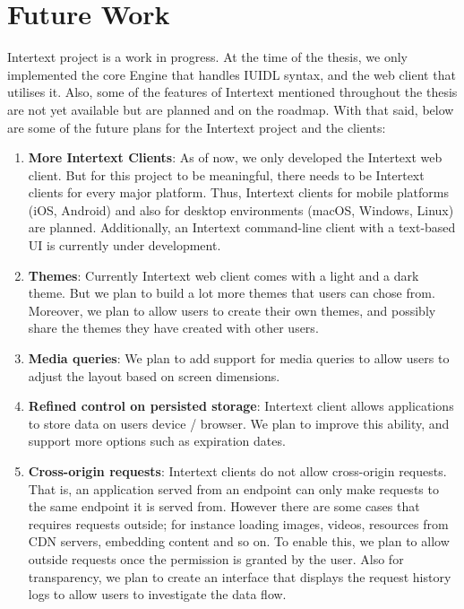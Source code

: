 \section{Future Work} \label{futureWork}

Intertext project is a work in progress. At the time of the thesis, we only implemented the core Engine that handles IUIDL syntax, and the web client that utilises it. Also, some of the features of Intertext mentioned throughout the thesis are not yet available but are planned and on the roadmap. With that said, below are some of the future plans for the Intertext project and the clients:

\begin{enumerate}
    \item \textbf{More Intertext Clients}: As of now, we only developed the Intertext web client. But for this project to be meaningful, there needs to be Intertext clients for every major platform. Thus, Intertext clients for mobile platforms (iOS, Android) and also for desktop environments (macOS, Windows, Linux) are planned. Additionally, an Intertext command-line client with a text-based UI is currently under development.
    
    \item \textbf{Themes}: Currently Intertext web client comes with a light and a dark theme. But we plan to build a lot more themes that users can chose from. Moreover, we plan to allow users to create their own themes, and possibly share the themes they have created with other users.
    
    \item \textbf{Media queries}: We plan to add support for media queries to allow users to adjust the layout based on screen dimensions.
    \item \textbf{Refined control on persisted storage}: Intertext client allows applications to store data on users device / browser. We plan to improve this ability, and support more options such as expiration dates.
    
    \item \textbf{Cross-origin requests}: Intertext clients do not allow cross-origin requests. That is, an application served from an endpoint can only make requests to the same endpoint it is served from. However there are some cases that requires requests outside; for instance loading images, videos, resources from CDN servers, embedding content and so on. To enable this, we plan to allow outside requests once the permission is granted by the user. Also for transparency, we plan to create an interface that displays the request history logs to allow users to investigate the data flow.
    

\end{enumerate}
